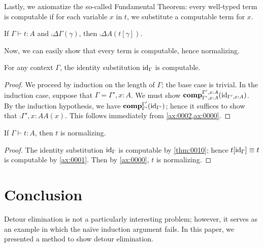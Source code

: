 \documentclass[a4paper]{article}
\begin{document}
Lastly, we axiomatize the so-called Fundamental Theorem: every well-typed term is computable if for each variable $x$ in $t$, we substitute a computable term for $x$.

\begin{axiom}\label{ax:0001}
  If $\Gamma \vdash t : A$ and $\comp{\Delta}{\Gamma}(\gamma)$, then $\comp{\Delta}{A}(t[\gamma])$.
\end{axiom}

Now, we can easily show that every term is computable, hence normalizing.

\begin{lemma}\label{thm:0010}
  For any context $\Gamma$, the identity substitution $\mathrm{id}_{\Gamma}$ is computable.
\end{lemma}
\begin{proof}
  We proceed by induction on the length of $\Gamma$; the base case is trivial.
  In the induction case, suppose that $\Gamma = \Gamma',x : A$.
  We must show $\operatorname{\mathbf{comp}}^{\Gamma',x : A}_{\Gamma',x : A}(\mathrm{id}_{\Gamma',x : A})$.
  By the induction hypothesis, we have $\operatorname{\mathbf{comp}}^{\Gamma'}_{\Gamma'}(\mathrm{id}_{\Gamma'})$; hence it suffices to show that $\comp{\Gamma',x : A}{A}(x)$.
  This follows immediately from \cref{ax:0002,ax:0000}.
\end{proof}

\begin{theorem}[Normalization]\label{thm:0000}
  If $\Gamma \vdash t : A$, then $t$ is normalizing.
\end{theorem}
\begin{proof}
  The identity substitution $\mathrm{id}_{\Gamma}$ is computable by \cref{thm:0010}; hence $t[\mathrm{id}_{\Gamma}] \equiv t$ is computable by \cref{ax:0001}.
  Then by \cref{ax:0000}, $t$ is normalizing.
\end{proof}

\section{Conclusion}
\label{sec:0007}

Detour elimination is not a particularly interesting problem; however, it serves as an example in which the na\"ive induction argument fails.
In this paper, we presented a method to show detour elimination.
\end{document}
